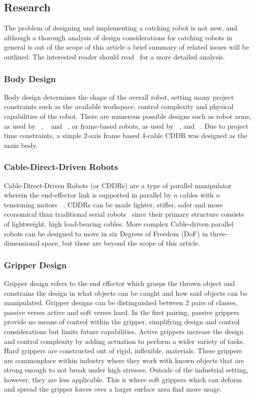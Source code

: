 \documentclass[conference]{IEEEtran}
\begin{document}
\subsection{Research}\label{research}
The problem of designing and implementing a catching robot is not new, and although a thorough analysis of design considerations for catching robots in general is out of the scope of this article a brief summary of related issues will be outlined. The interested reader should read~\cite{Sorg2003VisualTA} for a more detailed analysis.

\subsubsection{Body Design}
Body design determines the shape of the overall robot, setting many project constraints such as the available workspace, control complexity and physical capabilities of the robot. There are numerous possible designs such as robot arms, as used by ~\cite{6810147}, ~\cite{malzahn2014modeling} and ~\cite{5980073}, or frame-based robots, as used by ~\cite{6385963}, and ~\cite{forpheus}. Due to project time constraints, a simple 2-axis frame based 4-cable CDDR was designed as the main body.

\subsubsection{Cable-Direct-Driven Robots}
Cable-Direct-Driven Robots (or CDDRs) are a type of parallel manipulator wherein the end-effector link is supported in parallel by $n$ cables with $n$ tensioning motors ~\cite{CDDR:description}. CDDRs can be made lighter, stiffer, safer and more economical than traditional serial robots~\cite{WilliamsII2003} since their primary structure consists of lightweight, high load-bearing cables. More complex Cable-driven parallel robots can be designed to move in six Degrees of Freedom (DoF) in three-dimensional space, but these are beyond the scope of this article. 

\subsubsection{Gripper Design}
Gripper design refers to the end effector which grasps the thrown object and constrains the design in what objects can be caught and how said objects can be manipulated. Gripper designs can be distinguished between 2 pairs of classes, passive verses active and soft verses hard.
In the first pairing, passive grippers provide no means of control within the gripper, simplifying design and control considerations but limits future capabilities. Active grippers increase the design and control complexity by adding actuation to perform a wider variety of tasks.
Hard grippers are constructed out of rigid, inflexible, materials. These grippers are commonplace within industry where they work with known objects that are strong enough to not break under high stresses. Outside of the industrial setting, however, they are less applicable. This is where soft grippers which can deform and spread the gripper forces over a larger surface area find more usage.
\end{document}
